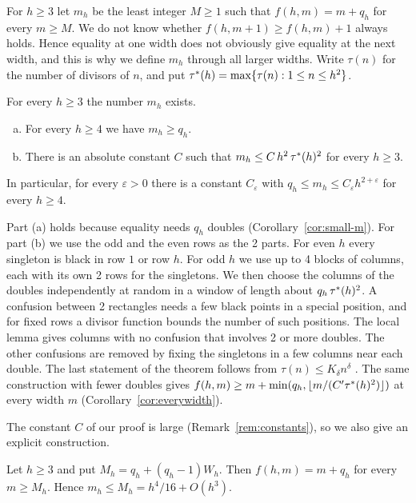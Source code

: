 For $h\ge3$ let $m_h$ be the least integer $M\ge1$ such that $f(h,m)=m+q_h$ for every
$m\ge M$. We do not know whether $f(h,m+1)\ge f(h,m)+1$ always holds. Hence equality at one
width does not obviously give equality at the next width, and this is why we define $m_h$
through all larger widths. Write $\tau(n)$ for the number of divisors of $n$, and put
${\tau^*}(h)=\max\{\tau(n):1\le n\le h^2\}$.

\begin{theorem}\label{thm:threshold}
For every $h\ge3$ the number $m_h$ exists.
\begin{enumerate}[(a)]
\item For every $h\ge4$ we have $m_h\ge q_h$.
\item There is an absolute constant $C$ such that $m_h\le C\,h^2\,{\tau^*}(h)^2$ for every
$h\ge3$.
\end{enumerate}
In particular, for every $\varepsilon>0$ there is a constant $C_\varepsilon$ with
$q_h\le m_h\le C_\varepsilon h^{2+\varepsilon}$ for every $h\ge4$.
\end{theorem}

Part (a) holds because equality needs $q_h$ doubles (Corollary~\ref{cor:small-m}). For
part (b) we use the odd and the even rows as the 2 parts. For even $h$ every singleton is
black in row $1$ or row $h$. For odd $h$ we use up to 4 blocks of columns, each with its
own 2 rows for the singletons. We then choose the columns of the doubles independently at
random in a window of length about $q_h\,{\tau^*}(h)^2$. A confusion between 2 rectangles
needs a few black points in a special position, and for fixed rows a divisor function
bounds the number of such positions. The local lemma gives columns with no confusion that
involves 2 or more doubles. The other confusions are removed by fixing the singletons in a
few columns near each double. The last statement of the theorem follows from
$\tau(n)\le K_\delta n^\delta$ \cite[Theorem~315]{hardywright2008}. The same construction
with fewer doubles gives $f(h,m)\ge m+\min(q_h,\lfloor m/(C'{\tau^*}(h)^2)\rfloor)$ at every
width $m$ (Corollary~\ref{cor:everywidth}).

The constant $C$ of our proof is large (Remark~\ref{rem:constants}), so we also give an
explicit construction.

\begin{proposition}\label{thm:general}
Let $h\ge3$ and put $M_h=q_h+(q_h-1)W_h$. Then $f(h,m)=m+q_h$ for every $m\ge M_h$. Hence
$m_h\le M_h=h^4/16+O(h^3)$.
\end{proposition}

